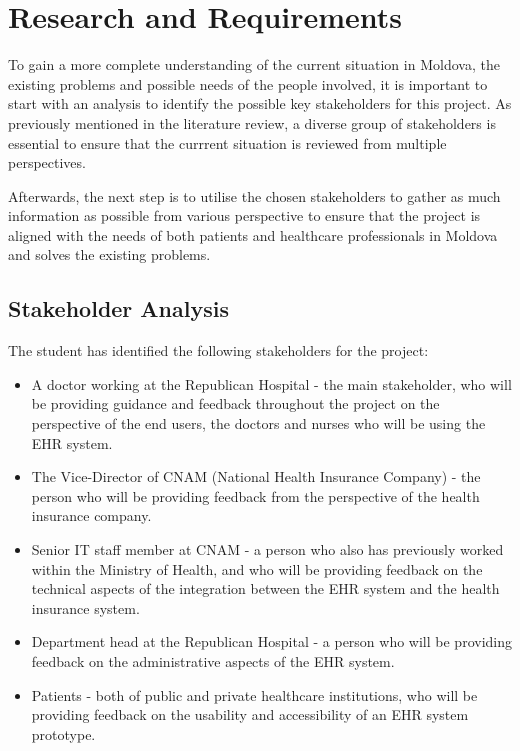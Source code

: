 \chapter{Research and Requirements}

To gain a more complete understanding of the current situation in Moldova, the existing problems and possible needs of the people involved, it is important to start with an analysis to identify the possible key stakeholders for this project. As previously mentioned in the literature review, a diverse group of stakeholders is essential to ensure that the currrent situation is reviewed from multiple perspectives. 

Afterwards, the next step is to utilise the chosen stakeholders to gather as much information as possible from various perspective to ensure that the project is aligned with the needs of both patients and healthcare professionals in Moldova and solves the existing problems.

\section{Stakeholder Analysis}

The student has identified the following stakeholders for the project:

\begin{itemize}
    \item A doctor working at the Republican Hospital - the main stakeholder, who will be providing guidance and feedback throughout the project on the perspective of the end users, the doctors and nurses who will be using the EHR system.
    \item The Vice-Director of CNAM (National Health Insurance Company) - the person who will be providing feedback from the perspective of the health insurance company.
    \item Senior IT staff member at CNAM - a person who also has previously worked within the Ministry of Health, and who will be providing feedback on the technical aspects of the integration between the EHR system and the health insurance system.
    \item Department head at the Republican Hospital - a person who will be providing feedback on the administrative aspects of the EHR system.
    \item Patients - both of public and private healthcare institutions, who will be providing feedback on the usability and accessibility of an EHR system prototype.
\end{itemize}

